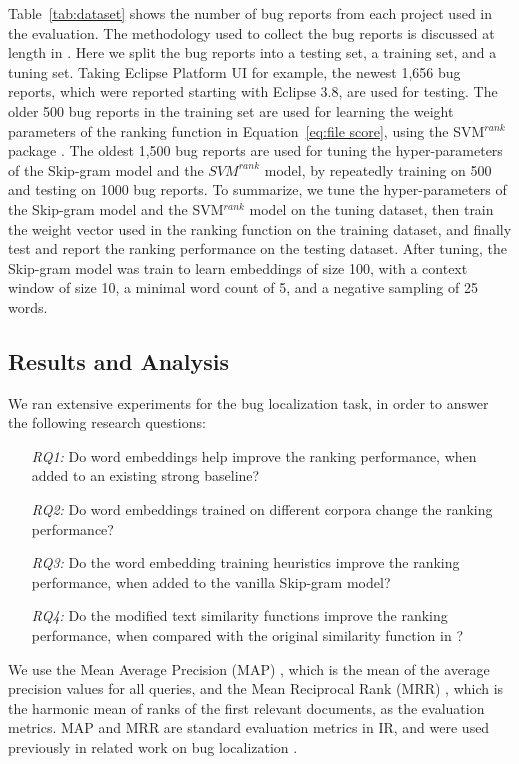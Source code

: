 Table~\ref{tab:dataset} shows the number of bug reports from each project used in the evaluation. The methodology used to collect the bug reports is discussed at length in \cite{Ye:FSE14}. Here we split the bug reports into a testing set, a training set, and a tuning set. Taking Eclipse Platform UI for example, the newest 1,656 bug reports, which were reported starting with Eclipse 3.8, are used for testing. The older 500 bug reports in the training set are used for learning the weight parameters of the ranking function in Equation~\ref{eq:file score}, using the SVM$^{rank}$ package \cite{Joachims:2002:OSE:775047.775067, Joachims:2006:TLS:1150402.1150429}. The oldest 1,500 bug reports are used for tuning the hyper-parameters of the Skip-gram model and the $SVM^{rank}$ model, by repeatedly training on 500 and testing on 1000 bug reports. To summarize, we tune the hyper-parameters of the Skip-gram model and the SVM$^{rank}$ model on the tuning dataset, then train the weight vector used in the ranking function on the training dataset, and finally test and report the ranking performance on the testing dataset. After tuning, the Skip-gram model was train to learn embeddings of size 100, with a context window of size 10, a minimal word count of 5, and a negative sampling of 25 words. 


\subsection{Results and Analysis}
\label{sec:evaluation:results and analysis}

We ran extensive experiments for the bug localization task, in order to answer the following research questions:
\begin{enumerate}
  \item[\textit{RQ1:}] Do word embeddings help improve the ranking performance, when added to an existing strong baseline?
  \item[\textit{RQ2:}] Do word embeddings trained on different corpora change the ranking performance?
  \item[\textit{RQ3:}] Do the word embedding training heuristics improve the ranking performance, when added to the vanilla Skip-gram model?
  \item[\textit{RQ4:}] Do the modified text similarity functions improve the ranking performance, when compared with the original similarity function in \cite{mihalcea:aaai06}?
\end{enumerate}

We use the Mean Average Precision (MAP) \cite{Manning:2008:IIR:1394399}, which is the mean of the average precision values for all queries, and the Mean Reciprocal Rank (MRR) \cite{Voorhees99thetrec-8}, which is the harmonic mean of ranks of the first relevant documents, as the evaluation metrics. MAP and MRR are standard evaluation metrics in IR, and were used previously in related work on bug localization \cite{Saha:2013:ASE:6693093, Ye:FSE14,Zhou:2012:BFM:2337223.2337226}.


